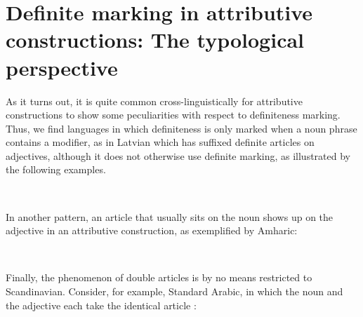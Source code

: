\section{Definite marking in attributive constructions: The typological perspective}

As it turns out, it is quite common cross-linguistically for attributive constructions to show some peculiarities with respect to definiteness marking. Thus, we find languages in which definiteness is only marked when a noun phrase contains a modifier, as in Latvian which has suffixed definite articles on adjectives, although it does not otherwise use definite marking, as illustrated by the following examples. 

\ea\label{}
\\

\z 
\z 

In another pattern, an article that usually sits on the noun shows up on the adjective in an attributive construction, as exemplified by Amharic:

\ea\label{}
\\

\z 
\z 

Finally, the phenomenon of double articles is by no means restricted to Scandinavian. Consider, for example, Standard Arabic, in which the noun and the adjective each take the identical article :

\ea\label{}
\\

\z 
\z 

